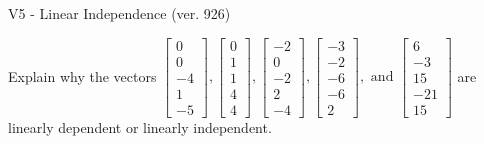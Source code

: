 \begin{exercise}
  \begin{exerciseTitle}V5 - Linear Independence (ver. 926)\end{exerciseTitle}
  \begin{exerciseStatement}
    Explain why the vectors \(\left[\begin{array}{r}
0 \\
0 \\
-4 \\
1 \\
-5
\end{array}\right] , \left[\begin{array}{r}
0 \\
1 \\
1 \\
4 \\
4
\end{array}\right] , \left[\begin{array}{r}
-2 \\
0 \\
-2 \\
2 \\
-4
\end{array}\right] , \left[\begin{array}{r}
-3 \\
-2 \\
-6 \\
-6 \\
2
\end{array}\right] , \text{ and } \left[\begin{array}{r}
6 \\
-3 \\
15 \\
-21 \\
15
\end{array}\right]\) are linearly dependent or linearly independent.	



\end{exerciseStatement}
\end{exercise}
